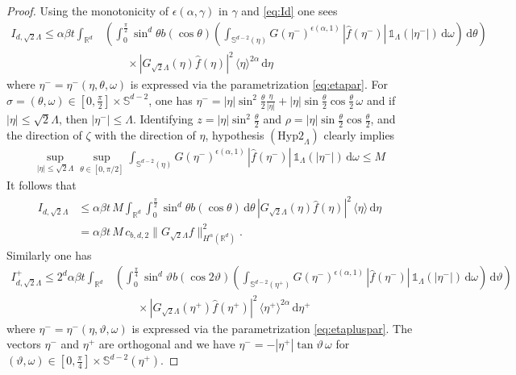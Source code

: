 \documentclass[11pt,a4paper,reqno]{amsart}
\theoremstyle{plain}
\theoremstyle{definition}
\begin{document}
\begin{proof} Using the monotonicity of $\epsilon(\alpha,\gamma)$ in $\gamma$ and \eqref{eq:Id} one sees
\begin{align*}
		I_{d,\sqrt{2}\Lambda} \le \alpha \beta t
			\int_{{\mathbb{R}}^d}&\left(\int_{0}^{\tfrac{\pi}{2}} \sin^{d}\theta b(\cos\theta)
			\left(\int_{{\mathbb{S}}^{d-2}(\eta)}  G(\eta^-)^{\epsilon\left(\alpha, 1\right)}\,|\hat{f}(\eta^-)| \, {\mathds{1}}_{\Lambda}(|\eta^-|)\,\mathrm{d}\omega \right) \,\mathrm{d}\theta \right) \\
			&\qquad \times |G_{\sqrt{2}\Lambda}(\eta) \hat{f}(\eta)|^2 \,\langle \eta \rangle^{2\alpha}  \, \mathrm{d}\eta
\end{align*}
where $\eta^-= \eta^-(\eta,\theta,\omega)$ is expressed via the parametrization \eqref{eq:etapar}. For $\sigma=(\theta, \omega)\in [0, \frac{\pi}{2}]\times {\mathbb{S}}^{d-2}$, one has $\eta^-  = |\eta|\sin^2\frac{\theta}{2} \frac{\eta}{|\eta|}+ |\eta| \sin\frac{\theta}{2}\cos\frac{\theta}{2} \, \omega$ and if $|\eta|\le \sqrt{2}\Lambda$, then $|\eta^-|\le \Lambda$. Identifying $z= |\eta|\sin^2\tfrac{\theta}{2}$ and $\rho= |\eta|\sin\frac{\theta}{2}\cos\frac{\theta}{2} $, and the direction of $\zeta$ with the direction of $\eta$,
 hypothesis $(\mathrm{Hyp2}_{\Lambda})$ clearly implies
 \begin{align*}
 	\sup_{|\eta|\le \sqrt{2}\Lambda}\sup_{\theta\in [0,\pi/2]}
 	\int_{{\mathbb{S}}^{d-2}(\eta)}  G(\eta^-)^{\epsilon\left(\alpha, 1\right)}\,|\hat{f}(\eta^-)| \, {\mathds{1}}_{\Lambda}(|\eta^-|)\,\mathrm{d}\omega
 	\le M
 \end{align*}
	It follows that
	\begin{align*}
		I_{d,\sqrt{2}\Lambda} &\leq  \alpha \beta t \, M \int_{{\mathbb{R}}^d} \int_0^{\frac{\pi}{2}} \sin^d\theta b(\cos\theta)\, \mathrm{d}\theta \,|G_{\sqrt{2}\Lambda}(\eta) \hat{f}(\eta)|^2 \, \langle \eta \rangle\,\mathrm{d}\eta \\
		&= \alpha \beta t \, M \, c_{b,d,2} \|G_{\sqrt{2}\Lambda}f\|_{H^{\alpha}({\mathbb{R}}^d)}^2.
	\end{align*}
Similarly one has
\begin{align*}
		I_{d,\sqrt{2}\Lambda}^+ \le 2^{d} \alpha \beta t
			\int_{{\mathbb{R}}^d}&\left(\int_{0}^{\tfrac{\pi}{4}} \sin^{d}\vartheta b(\cos2\vartheta)
			\left(\int_{{\mathbb{S}}^{d-2}(\eta^+)}  G(\eta^-)^{\epsilon\left(\alpha, 1\right)}\,|\hat{f}(\eta^-)| \, {\mathds{1}}_{\Lambda}(|\eta^-|)\,\mathrm{d}\omega \right) \,\mathrm{d}\vartheta \right) \\
			&\qquad \times |G_{\sqrt{2}\Lambda}(\eta^+) \hat{f}(\eta^+)|^2 \,\langle \eta^+ \rangle^{2\alpha}  \, \mathrm{d}\eta^+
\end{align*}
where $\eta^-= \eta^-(\eta,\vartheta,\omega)$ is expressed via the parametrization \eqref{eq:etapluspar}. The vectors $\eta^-$ and $\eta^+$ are orthogonal and we have $\eta^-  = -|\eta^+| \tan\vartheta\,\omega$ for $(\vartheta, \omega)\in[0, \frac{\pi}{4}] \times {\mathbb{S}}^{d-2}(\eta^+)$.
	

\end{proof}
\end{document}

